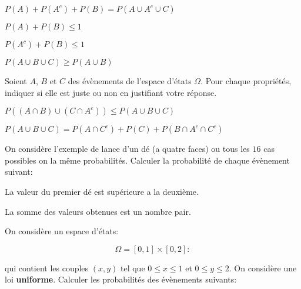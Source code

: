 \documentclass[10pt,largemargins]{homework}
\begin{document}
\begin{arabicparts}
    \item $ P(A) + P(A^c) + P(B) = P(A\cup A^c \cup C)$
    \item $ P(A) + P(B) \leq 1$
    \item $ P(A^c) + P(B) \leq 1$
    \item $ P(A\cup B \cup C) \geq P(A\cup B)$
\end{arabicparts}
Soient $A$, $B$ et $C$ des évènements de l'espace d'états $\Omega$. Pour chaque
propriétés, indiquer si elle est juste ou non en justifiant votre
réponse.


\begin{arabicparts}
\item $ P\left( (A\cap B) \cup ( C\cap A^c)\right) \leq P(A\cup B \cup C)$
\item $P(A\cup B\cup C) = P(A\cap C^c) + P(C) + P(B\cap A^c \cap C^c)$
\end{arabicparts}

On considère l'exemple de lance d'un dé (a quatre faces) ou tous les $16$ cas
possibles on la même probabilités. Calculer la probabilité de chaque évènement
suivant:
\begin{figure}[htpb]
\begin{center}
\end{center}
\end{figure}


\begin{arabicparts}
    \item La valeur du premier dé est supérieure a la deuxième.
    \item La somme des valeurs obtenues est un nombre pair.
\end{arabicparts}



On considère un espace d'états:

\begin{equation*}
    \Omega = [0,1]\times[0,2]:
\end{equation*}

qui contient les couples $(x,y)$ tel que $0\leq x\leq 1$ et $0\leq y\leq 2$. On
considère une loi \textbf{uniforme}. Calculer les probabilités des
évènements suivants:
\end{document}
